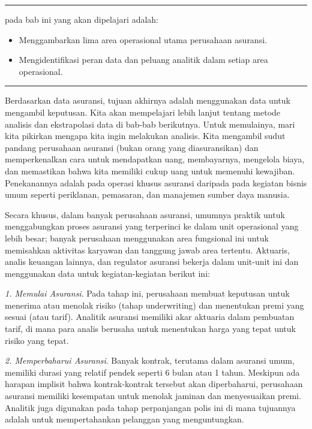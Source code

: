 \documentclass[
]{book}
\providecommand{\tightlist}{%
  \setlength{\itemsep}{0pt}\setlength{\parskip}{0pt}}
\begin{document}
\begin{center}\rule{0.5\linewidth}{0.5pt}\end{center}

pada bab ini yang akan dipelajari adalah:

\begin{itemize}
\tightlist
\item
  Menggambarkan lima area operasional utama perusahaan asuransi.
\item
  Mengidentifikasi peran data dan peluang analitik dalam setiap area operasional.
\end{itemize}

\begin{center}\rule{0.5\linewidth}{0.5pt}\end{center}

Berdasarkan data asuransi, tujuan akhirnya adalah menggunakan data untuk mengambil keputusan. Kita akan mempelajari lebih lanjut tentang metode analisis dan ekstrapolasi data di bab-bab berikutnya. Untuk memulainya, mari kita pikirkan mengapa kita ingin melakukan analisis. Kita mengambil sudut pandang perusahaan asuransi (bukan orang yang diasuransikan) dan memperkenalkan cara untuk mendapatkan uang, membayarnya, mengelola biaya, dan memastikan bahwa kita memiliki cukup uang untuk memenuhi kewajiban. Penekanannya adalah pada operasi khusus asuransi daripada pada kegiatan bisnis umum seperti periklanan, pemasaran, dan manajemen sumber daya manusia.

Secara khusus, dalam banyak perusahaan asuransi, umumnya praktik untuk menggabungkan proses asuransi yang terperinci ke dalam unit operasional yang lebih besar; banyak perusahaan menggunakan area fungsional ini untuk memisahkan aktivitas karyawan dan tanggung jawab area tertentu. Aktuaris, analis keuangan lainnya, dan regulator asuransi bekerja dalam unit-unit ini dan menggunakan data untuk kegiatan-kegiatan berikut ini:

\emph{1. Memulai Asuransi}. Pada tahap ini, perusahaan membuat keputusan untuk menerima atau menolak risiko (tahap underwriting) dan menentukan premi yang sesuai (atau tarif). Analitik asuransi memiliki akar aktuaria dalam pembuatan tarif, di mana para analis berusaha untuk menentukan harga yang tepat untuk risiko yang tepat.

\emph{2. Memperbaharui Asuransi}. Banyak kontrak, terutama dalam asuransi umum, memiliki durasi yang relatif pendek seperti 6 bulan atau 1 tahun. Meskipun ada harapan implisit bahwa kontrak-kontrak tersebut akan diperbaharui, perusahaan asuransi memiliki kesempatan untuk menolak jaminan dan menyesuaikan premi. Analitik juga digunakan pada tahap perpanjangan polis ini di mana tujuannya adalah untuk mempertahankan pelanggan yang menguntungkan.
\end{document}
